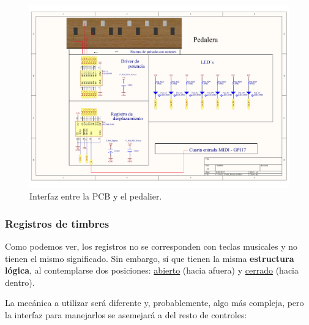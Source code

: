 \begin{figure}[H]
	\noindent \begin{centering}
		\includegraphics[width=\linewidth]{capitulo3/pcb_pedalier}
		\par\end{centering}
	\smallskip
	\caption{\label{fig:pcb_pedalier} Interfaz entre la PCB y el pedalier.}
\end{figure} 

\smallskip

\subsubsection{Registros de timbres}

Como podemos ver, los registros no se corresponden con teclas musicales y no tienen el mismo significado. Sin embargo, sí que tienen la misma \textbf{estructura lógica}, al contemplarse dos posiciones: \underline{abierto} (hacia afuera) y \underline{cerrado} (hacia dentro).

La mecánica a utilizar será diferente y, probablemente, algo más compleja, pero la interfaz para manejarlos se asemejará a del resto de controles:

\smallskip

